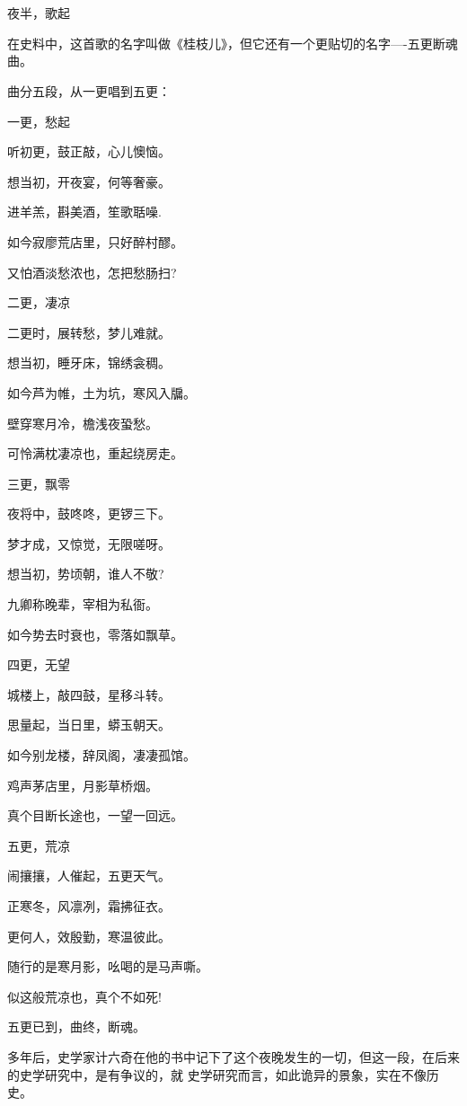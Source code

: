 \documentclass[11pt,a4paper,onecolumn]{article}
\begin{document}
\section[\thesection]{}

夜半，歌起

在史料中，这首歌的名字叫做《桂枝儿》，但它还有一个更贴切的名字----五更断魂曲。

曲分五段，从一更唱到五更：

一更，愁起

听初更，鼓正敲，心儿懊恼。

想当初，开夜宴，何等奢豪。

进羊羔，斟美酒，笙歌聒噪.

如今寂廖荒店里，只好醉村醪。

又怕酒淡愁浓也，怎把愁肠扫?

二更，凄凉

二更时，展转愁，梦儿难就。

想当初，睡牙床，锦绣衾稠。

如今芦为帷，土为坑，寒风入牖。

壁穿寒月冷，檐浅夜蛩愁。

可怜满枕凄凉也，重起绕房走。

三更，飘零

夜将中，鼓咚咚，更锣三下。

梦才成，又惊觉，无限嗟呀。

想当初，势顷朝，谁人不敬?

九卿称晚辈，宰相为私衙。

如今势去时衰也，零落如飘草。

四更，无望

城楼上，敲四鼓，星移斗转。

思量起，当日里，蟒玉朝天。

如今别龙楼，辞凤阁，凄凄孤馆。

鸡声茅店里，月影草桥烟。

真个目断长途也，一望一回远。

五更，荒凉

闹攘攘，人催起，五更天气。

正寒冬，风凛冽，霜拂征衣。

更何人，效殷勤，寒温彼此。

随行的是寒月影，吆喝的是马声嘶。

似这般荒凉也，真个不如死!

五更已到，曲终，断魂。

多年后，史学家计六奇在他的书中记下了这个夜晚发生的一切，但这一段，在后来的史学研究中，是有争议的，就
史学研究而言，如此诡异的景象，实在不像历史。
\end{document}
